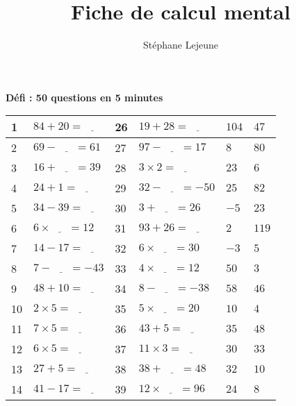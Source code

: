 \documentclass[french,a4paper,10pt]{article}
\title{\hspace{-3cm}\color{astral} \sffamily \bfseries Fiche de calcul mental}
\author{\hspace{-3cm}Stéphane Lejeune}
\date{}
\begin{document}
\maketitle
\begin{center}
\hspace*{-3cm}
\large \textbf{Défi : 50 questions en 5 minutes}
\end{center}
\noindent
\renewcommand{\arraystretch}{1.6}
\center
\begin{tabular}{|p{0.4cm}|p{4cm}|p{0.4cm}|p{4cm}||p{1cm}|p{1cm}|}
\hline
1 & $84 + 20 = \underline{\phantom{999}}$ & 26 & $19 + 28 = \underline{\phantom{999}}$ & $104$ & $47$ \\
\hline
2 & $69 - \underline{\phantom{999}} = 61$ & 27 & $97 - \underline{\phantom{999}} = 17$ & $8$ & $80$ \\
\hline
3 & $16 + \underline{\phantom{999}} = 39$ & 28 & $3 \times 2 = \underline{\phantom{999}}$ & $23$ & $6$ \\
\hline
4 & $24 + 1 = \underline{\phantom{999}}$ & 29 & $32 - \underline{\phantom{999}} = -50$ & $25$ & $82$ \\
\hline
5 & $34 - 39 = \underline{\phantom{999}}$ & 30 & $3 + \underline{\phantom{999}} = 26$ & $-5$ & $23$ \\
\hline
6 & $6 \times \underline{\phantom{999}} = 12$ & 31 & $93 + 26 = \underline{\phantom{999}}$ & $2$ & $119$ \\
\hline
7 & $14 - 17 = \underline{\phantom{999}}$ & 32 & $6 \times \underline{\phantom{999}} = 30$ & $-3$ & $5$ \\
\hline
8 & $7 - \underline{\phantom{999}} = -43$ & 33 & $4 \times \underline{\phantom{999}} = 12$ & $50$ & $3$ \\
\hline
9 & $48 + 10 = \underline{\phantom{999}}$ & 34 & $8 - \underline{\phantom{999}} = -38$ & $58$ & $46$ \\
\hline
10 & $2 \times 5 = \underline{\phantom{999}}$ & 35 & $5 \times \underline{\phantom{999}} = 20$ & $10$ & $4$ \\
\hline
11 & $7 \times 5 = \underline{\phantom{999}}$ & 36 & $43 + 5 = \underline{\phantom{999}}$ & $35$ & $48$ \\
\hline
12 & $6 \times 5 = \underline{\phantom{999}}$ & 37 & $11 \times 3 = \underline{\phantom{999}}$ & $30$ & $33$ \\
\hline
13 & $27 + 5 = \underline{\phantom{999}}$ & 38 & $38 + \underline{\phantom{999}} = 48$ & $32$ & $10$ \\
\hline
14 & $41 - 17 = \underline{\phantom{999}}$ & 39 & $12 \times \underline{\phantom{999}} = 96$ & $24$ & $8$ \\

\end{tabular}
\end{document}

